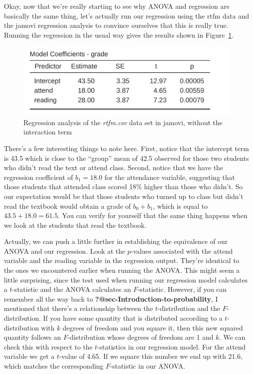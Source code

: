 \documentclass[
  a4paper,
]{book}
\begin{document}
Okay, now that we're really starting to see why ANOVA and regression are
basically the same thing, let's actually run our regression using the
rtfm data and the jamovi regression analysis to convince ourselves that
this is really true. Running the regression in the usual way gives the
results shown in Figure~\ref{fig-fig14-18}.

\begin{figure}

\includegraphics[width=1\textwidth,height=\textheight]{images/fig14-18.png} \hfill{}

\caption{\label{fig-fig14-18}Regression analysis of the \emph{rtfm.csv}
data set in jamovi, without the interaction term}

\end{figure}

There's a few interesting things to note here. First, notice that the
intercept term is 43.5 which is close to the ``group'' mean of 42.5
observed for those two students who didn't read the text or attend
class. Second, notice that we have the regression coefficient of
\(b_1 = 18.0\) for the attendance variable, suggesting that those
students that attended class scored 18\% higher than those who didn't.
So our expectation would be that those students who turned up to class
but didn't read the textbook would obtain a grade of \(b_0 + b_1\),
which is equal to \(43.5 + 18.0 = 61.5\). You can verify for yourself
that the same thing happens when we look at the students that read the
textbook.

Actually, we can push a little further in establishing the equivalence
of our ANOVA and our regression. Look at the \(p\)-values associated
with the attend variable and the reading variable in the regression
output. They're identical to the ones we encountered earlier when
running the ANOVA. This might seem a little surprising, since the test
used when running our regression model calculates a \(t\)-statistic and
the ANOVA calculates an \(F\)-statistic. However, if you can remember
all the way back to \textbf{?@sec-Introduction-to-probability}, I
mentioned that there's a relationship between the \(t\)-distribution and
the \(F\)-distribution. If you have some quantity that is distributed
according to a \(t\)-distribution with \(k\) degrees of freedom and you
square it, then this new squared quantity follows an \(F\)-distribution
whose degrees of freedom are 1 and \(k\). We can check this with respect
to the \(t\)-statistics in our regression model. For the attend variable
we get a \(t\)-value of 4.65. If we square this number we end up with
21.6, which matches the corresponding \(F\)-statistic in our ANOVA.
\end{document}

